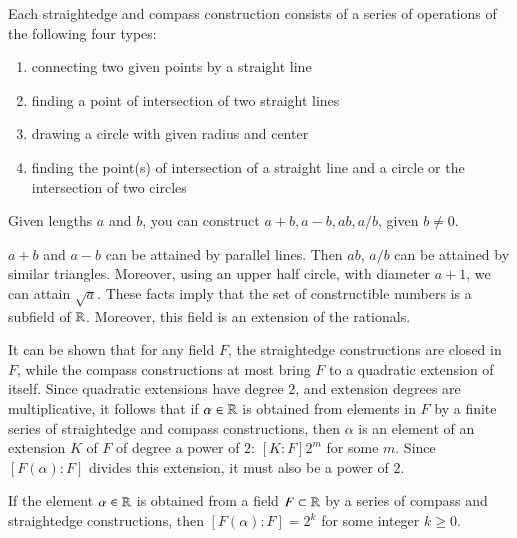 \documentclass[12pt, a4paper, oneside, openright, titlepage]{book}
\begin{document}
Each straightedge and compass construction consists of a series of operations of the following four types: 
\begin{enumerate}
    \item connecting two given points by a straight line
    \item finding a point of intersection of two straight lines
    \item drawing a circle with given radius and center
    \item finding the point(s) of intersection of a straight line and a circle or the intersection of two circles
\end{enumerate}


\begin{thm}
    Given lengths $a$ and $b$, you can construct $a+b,a-b,ab,a/b$, given $b \neq 0$. 
\end{thm}

$a+b$ and $a-b$ can be attained by parallel lines. Then $ab$, $a/b$ can be attained by similar triangles. Moreover, using an upper half circle, with diameter $a+1$, we can attain $\sqrt{a}$. These facts imply that the set of constructible numbers is a subfield of $\mathbb R$. Moreover, this field is an extension of the rationals. 

It can be shown that for any field $F$, the straightedge constructions are closed in $F$, while the compass constructions at most bring $F$ to a quadratic extension of itself. Since quadratic extensions have degree $2$, and extension degrees are multiplicative, it follows that if $\alpha \in \mathbb R$ is obtained from elements in $F$ by a finite series of straightedge and compass constructions, then $\alpha$ is an element of an extension $K$ of $F$ of degree a power of $2$: $[K:F] 2^m$ for some $m$. Since $[F(\alpha):F]$ divides this extension, it must also be a power of $2$.

\begin{prop}
    If the element $\alpha \in \mathbb R$ is obtained from a field $F \subset \mathbb R$ by a series of compass and straightedge constructions, then $[F(\alpha):F] = 2^k$ for some integer $k \geq 0$.
\end{prop}
\end{document}
